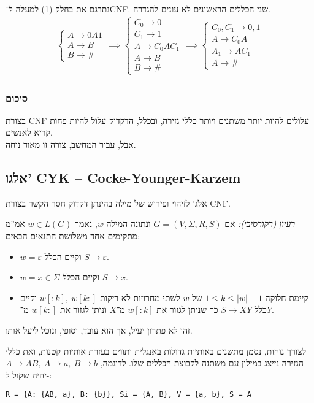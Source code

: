 \documentclass[]{article}
\newcommand\sen   {\selectlanguage{english}}
\newcommand\she   {\selectlanguage{hebrew}}
\newcommand\Si    {\Sigma}
\newcommand\vepsi {\varepsilon}
\begin{document}
	נתרגם את בחלק (1) למעלה ל־CNF. שני הכללים הראשונים לא עונים להגדרה. 
	\begin{align}
		\begin{cases}
			A \to 0A1 \\
			A \to B\\
			B \to \#
		\end{cases} \implies 
		\begin{cases}
			C_0 \to 0 \\
			C_1 \to 1 \\
			A \to C_0AC_1 \\
			A \to B \\
			B \to \#
		\end{cases} \implies
		\begin{cases}
			C_0, C_1 \to 0, 1 \\
			A \to C_0A \\
			A_1 \to AC_1 \\
			A \to \#
		\end{cases}
	\end{align}
	
	\subsubsection{סיכום}
	בצורת CNF עלולים להיות יותר משתנים ויותר כללי גזירה, ובכלל, הדקדוק עלול להיות פחות קריא לאנשים. \\
	אבל, עבור המחשב, צורה זו מאוד נוחה. 
	\subsection{אלגו' CYK -- Cocke-Younger-Karzem}
	אלג' לזיהוי ופירוש של מילה בהינתן דקדוק חסר הקשר בצורת CNF. 
	
	\textit{רעיון (רקורסיבי): }אם $G = (V, \Si, R, S)$ ונתונה המילה $w$, נאמר $w \in L(G)$ אמ''מ מתקימים אחד משלושת התנאים הבאים: 
	\begin{itemize}
		\item $w = \vepsi$ וקיים הכלל $S \to \vepsi$. 
		\item $w = x \in \Si$ וקיים הכלל $S \to x$. 
		\item קיימת חלוקה $1 \le k \le |w| - 1$ של $w$ לשתי מחרוזות לא ריקות $w[:k], \ w[k: ]$ וקיים כלל $S \to XY$ כך שניתן לגזור את $w[:k]$ מ־$X$ וניתן לגזור את $w[k:]$ מ־$Y$. 
	\end{itemize}
	זהו לא פתרון יעיל, אך הוא עובד, וסופי, ונוכל ליעל אותו. 
	
	לצורך נוחות, נסמן מתשנים באותיות גדולות באנגלית ותווים בעזרת אותיות קטנות, ואת כללי הגזירה נייצג במילון עם משתנה לקבוצת הכללים שלו. לדוגמה, $A \to AB, \ A \to a, \ B \to b$ יהיה שקול ל-:
	\sen
	\begin{lstlisting}
R = {A: {AB, a}, B: {b}}, Si = {A, B}, V = {a, b}, S = A \end{lstlisting}
	\she
	
\end{document}
